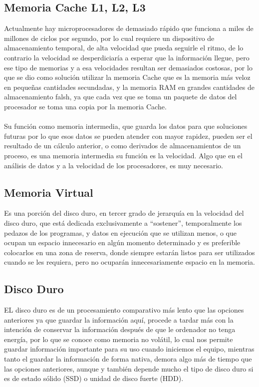 \documentclass{article}
\begin{document}
	\subsection{Memoria Cache L1, L2, L3}
	Actualmente hay microprocesadores de demasiado rápido que funciona a miles de millones de  ciclos por segundo, por lo cual requiere un dispositivo de almacenamiento temporal, de alta velocidad que pueda seguirle el ritmo, de lo contrario la velocidad se desperdiciaría a esperar que la información llegue, pero ese tipo de memorias y a esa velocidades resultan ser demasiados costosas, por lo que se dio como solución utilizar la memoria Cache que es la memoria más veloz en pequeñas cantidades secundadas, y la memoria RAM en grandes cantidades de almacenamiento falsh, ya que cada vez que se toma un paquete de datos del procesador se toma una copia por la memoria Cache.
	\\\\
	Su función como memoria intermedia, que guarda los datos para que soluciones futuras por lo que esos datos se pueden atender con mayor rapidez, pueden ser el resultado de un cálculo anterior, o como derivados de almacenamientos de un proceso, es una memoria intermedia su función es la velocidad. Algo que en el análisis de datos y a la velocidad de los procesadores, es muy necesario.
	
	\subsection{Memoria Virtual}
	Es una porción del disco duro, en tercer grado de jerarquía en la velocidad del disco duro, que está dedicada exclusivamente a “sostener”, temporalmente los pedazos de los programas, y datos en ejecución que se utilizan menos, o que ocupan un espacio innecesario en algún momento determinado y es preferible colocarlos en una zona de reserva, donde siempre estarán listos para ser utilizados cuando se les requiera, pero no ocuparán innecesariamente espacio en la memoria.
	
	\subsection{Disco Duro}
	EL disco duro es de un procesamiento comparativo más lento que las opciones anteriores ya que guardar la información aquí, procede a tardar más con la intención de conservar la información después de que le ordenador no tenga energía, por lo que se conoce como memoria no volátil, lo cual nos permite guardar información importante para su uso cuando iniciemos el equipo, mientras tanto el guardar la información de forma nativa, demora algo más de tiempo que las opciones anteriores, aunque y también depende mucho el tipo de disco duro si es de estado sólido (SSD) o unidad de disco fuerte (HDD).
	
\end{document}
